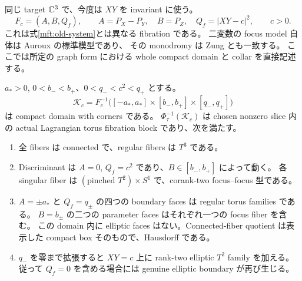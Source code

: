 同じ target $\mathbb C^3$ で、今度は $XY$ を invariant に使う。
\begin{equation}\label{mft:focus-system}
 F_c=(A,B,Q_f),\qquad
 A=P_X-P_Y,\quad B=P_Z,\quad Q_f=|XY-c|^2,
 \qquad c>0.
\end{equation}
これは式\eqref{mft:old-system}とは異なる fibration である。
二変数の focus model 自体は Auroux \cite[Section 5.1]{auroux-local} の標準模型であり、
その monodromy は Zung \cite[Section 3]{zung-focus-cf} とも一致する。
ここでは所定の graph form における whole compact domain と collar を直接記述する。

\begin{theorem}
\label{mft:focus-block}
$a_*>0$, $0<b_-<b_+$、$0<q_-<c^2<q_+$ とする。
\[
 \mathcal K_c
 =F_c^{-1}\bigl([-a_*,a_*]\times[b_-,b_+]\times[q_-,q_+]\bigr)
\]
は compact domain with corners である。
$\Phi_\tau^{-1}(\mathcal K_c)$ は chosen nonzero slice 内の actual Lagrangian
torus fibration block であり、次を満たす。
\begin{enumerate}
\item 全 fibers は connected で、regular fibers は $T^3$ である。
\item Discriminant は $A=0$, $Q_f=c^2$ であり、$B\in[b_-,b_+]$ によって動く。
各 singular fiber は $(\text{pinched }T^2)\times S^1$ で、corank-two focus--focus 型である。
\item $A=\pm a_*$ と $Q_f=q_\pm$ の四つの boundary faces は regular torus families である。
$B=b_\pm$ の二つの parameter faces はそれぞれ一つの focus fiber を含む。
この domain 内に elliptic faces はない。Connected-fiber quotient は表示した compact box そのもので、Hausdorff である。
\item $q_-$ を零まで拡張すると $XY=c$ 上に rank-two elliptic $T^2$ family を加える。
従って $Q_f=0$ を含める場合には genuine elliptic boundary が再び生じる。
\end{enumerate}
\end{theorem}


